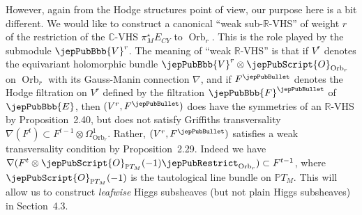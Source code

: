 However, again from the Hodge structures point of view, our purpose here is a bit different. We would like to construct a canonical ``weak sub-$\mathbb R$-VHS'' of weight $r$ of the restriction of the $\mathbb C$-VHS $\pi_M^\star E_{CY}$ to $\operatorname{Orb}_r$. This is the role played by the submodule $\jepPubBbb{V}^r$. The meaning of ``weak $\mathbb R$-VHS'' is that if $V^r$ denotes the equivariant holomorphic bundle $\jepPubBbb{V}^r\otimes\jepPubScript{O}_{\operatorname{Orb}_r}$ on $\operatorname{Orb}_r$ with its Gauss-Manin connection $\nabla$, and if $F^\jepPubBullet$ denotes the Hodge filtration on $V^r$ defined by the filtration $\jepPubBbb{F}^\jepPubBullet$ of $\jepPubBbb{E}$, then $(V^r,F^\jepPubBullet)$ does have the symmetries of an $\mathbb R$-VHS by Proposition~2.40, but does not satisfy Griffiths transversality $\nabla(F^t)\subset F^{t-1}\otimes\Omega^1_{\operatorname{Orb}_r}$. Rather, $(V^r,F^\jepPubBullet)$ satisfies a weak transversality condition by Proposition~2.29. Indeed we have $\nabla(F^t\otimes\jepPubScript{O}_{\mathbb PT_M}(-1)\jepPubRestrict_{\operatorname{Orb}_r})\subset F^{t-1}$, where $\jepPubScript{O}_{\mathbb PT_M}(-1)$ is the tautological line bundle on $\mathbb PT_M$. This will allow us to construct \emph{leafwise} Higgs subsheaves (but not plain Higgs subsheaves) in Section~4.3.

